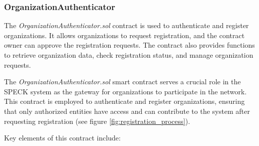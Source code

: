 \documentclass[oneside,a4paper,12pt, colorinlistoftodos]{article} %
\begin{document}
\subsubsection{OrganizationAuthenticator}

The \textit{OrganizationAuthenticator.sol} contract is used to authenticate and register organizations. It allows organizations to request registration, and the contract owner can approve the registration requests. The contract also provides functions to retrieve organization data, check registration status, and manage organization requests.

The \textit{OrganizationAuthenticator.sol} smart contract serves a crucial role in the SPECK system as the gateway for organizations to participate in the network. This contract is employed to authenticate and register organizations, ensuring that only authorized entities have access and can contribute to the system after requesting registration (see figure 
 \ref{fig:registration_process}).



Key elements of this contract include:
\end{document}
